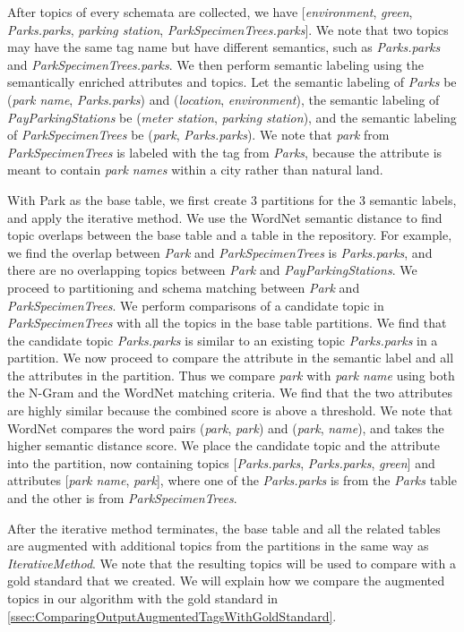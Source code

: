 After topics of every schemata are collected, we have [\textit{environment}, \textit{green}, \textit{Parks.parks}, \textit{parking station}, \textit{ParkSpecimenTrees.parks}]. We note that two topics may have the same tag name but have different semantics, such as \textit{Parks.parks} and \textit{ParkSpecimenTrees.parks}. We then perform semantic labeling using the semantically enriched attributes and topics. Let the semantic labeling of \textit{Parks} be (\textit{park name}, \textit{Parks.parks}) and (\textit{location}, \textit{environment}), the semantic labeling of \textit{PayParkingStations} be (\textit{meter station}, \textit{parking station}), and the semantic labeling of \textit{ParkSpecimenTrees} be (\textit{park}, \textit{Parks.parks}). We note that \textit{park} from \textit{ParkSpecimenTrees} is labeled with the tag from \textit{Parks}, because the attribute is meant to contain \textit{park names} within a city rather than natural land.

With Park as the base table, we first create 3 partitions for the 3 semantic labels, and apply the iterative method. We use the WordNet semantic distance to find topic overlaps between the base table and a table in the repository. For example, we find the overlap between \textit{Park} and \textit{ParkSpecimenTrees} is \textit{Parks.parks}, and there are no overlapping topics between \textit{Park} and \textit{PayParkingStations}. We proceed to partitioning and schema matching between \textit{Park} and \textit{ParkSpecimenTrees}. We perform comparisons of a candidate topic in \textit{ParkSpecimenTrees} with all the topics in the base table partitions. We find that the candidate topic \textit{Parks.parks} is similar to an existing topic \textit{Parks.parks} in a partition. We now proceed to compare the attribute in the semantic label and all the attributes in the partition. Thus we compare \textit{park} with \textit{park name} using both the N-Gram and the WordNet matching criteria. We find that the two attributes are highly similar because the combined score is above a threshold. We note that WordNet compares the word pairs (\textit{park}, \textit{park}) and (\textit{park}, \textit{name}), and takes the higher semantic distance score. We place the candidate topic and the attribute into the partition, now containing topics [\textit{Parks.parks}, \textit{Parks.parks}, \textit{green}] and attributes [\textit{park name}, \textit{park}], where one of the \textit{Parks.parks} is from the \textit{Parks} table and the other is from \textit{ParkSpecimenTrees}.

After the iterative method terminates, the base table and all the related tables are augmented with additional topics from the partitions in the same way as \textit{IterativeMethod}. We note that the resulting topics will be used to compare with a gold standard that we created. We will explain how we compare the augmented topics in our algorithm with the gold standard in \autoref{ssec:ComparingOutputAugmentedTagsWithGoldStandard}.
\endinput